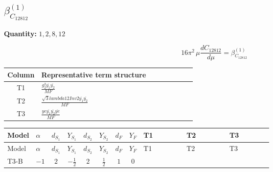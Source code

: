 \documentclass[8pt]{article}
\begin{document}
\begin{landscape}
\section*{$\beta_{C_{12812}}^{(1)}$}
\noindent\textbf{Quantity: }$\mathrm{1,2,8,12}$\par\smallskip
\[16\pi^2\,\mu\frac{d C_{12812}}{d\mu}=\beta_{C_{12812}}^{(1)}\]
\begin{center}
\begin{tabular}{@{}c >{\raggedright\arraybackslash}p{0.82\linewidth}@{}}
\toprule
Column & Representative term structure \\
\midrule
T1 & \(\displaystyle \frac{g_{2}^{2} \overline{y_{1}} \overline{y_{2}}}{MF}\) \\
\midrule
T2 & \(\displaystyle \frac{\sqrt{3} lambda12Inv2 \overline{y_{1}} \overline{y_{2}}}{MF}\) \\
\midrule
T3 & \(\displaystyle \frac{ye \overline{y_{1}} \overline{y_{2}} \overline{ye}}{MF}\) \\
\midrule
\bottomrule
\end{tabular}
\end{center}
\smallskip
\tiny
\begin{longtable}{@{}llcccccc >{\raggedright\arraybackslash}p{0.21\linewidth} >{\raggedright\arraybackslash}p{0.21\linewidth} >{\raggedright\arraybackslash}p{0.21\linewidth}@{}}
\toprule
Model & $\alpha$ & $d_{S_1}$ & $Y_{S_1}$ & $d_{S_2}$ & $Y_{S_2}$ & $d_F$ & $Y_F$ & T1 & T2 & T3 \\
\midrule
\endfirsthead
\toprule
Model & $\alpha$ & $d_{S_1}$ & $Y_{S_1}$ & $d_{S_2}$ & $Y_{S_2}$ & $d_F$ & $Y_F$ & T1 & T2 & T3 \\
\midrule
\endhead
T3-B & $-1$ & $2$ & $-\frac{1}{2}$ & $2$ & $\frac{1}{2}$ & $1$ & $0$ & \scriptsize\adjustbox{max width=\linewidth}{$\begin{gathered} - \frac{3 g_{2}^{2} \overline{y_{1}} \overline{y_{2}}}{8 MF}\end{gathered}$} & \scriptsize\adjustbox{max width=\linewidth}{$\begin{gathered} - \frac{\sqrt{3} lambda12Inv2 \overline{y_{1}} \overline{y_{2}}}{6 MF}\end{gathered}$} & \scriptsize\adjustbox{max width=\linewidth}{$\begin{gathered} \frac{ye \overline{y_{1}} \overline{y_{2}} \overline{ye}}{8 MF}\end{gathered}$} \\
\midrule
\bottomrule
\end{longtable}
\clearpage

\end{landscape}
\end{document}
